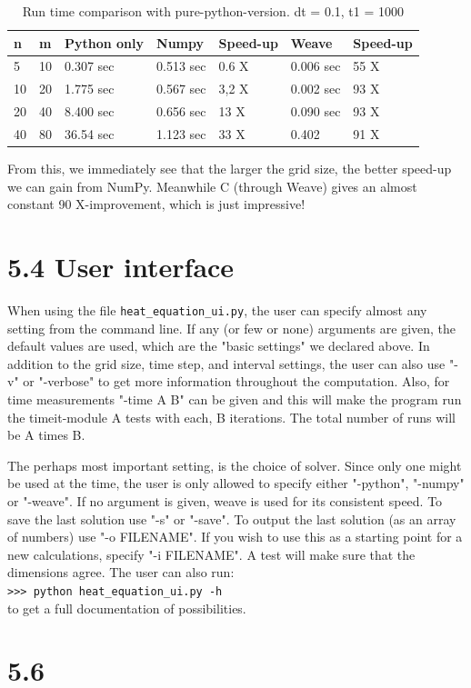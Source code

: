 \documentclass[a4paper]{article}
\begin{document}
\begin{table}[ht]
\centering
\begin{tabular}{|l|l|l|l|l|l|l|}
\hline
\textbf{n} & \textbf{m} & \textbf{Python only} & \textbf{Numpy} & \textbf{Speed-up} & \textbf{Weave} & \textbf{Speed-up} \\ \hline
5 & 10 & 0.307 sec & 0.513 sec & 0.6 X & 0.006 sec & 55 X \\ \hline
10 & 20 & 1.775 sec & 0.567 sec & 3,2 X & 0.002 sec & 93 X \\ \hline
20 & 40 & 8.400 sec & 0.656 sec & 13 X & 0.090 sec & 93 X \\ \hline
40 & 80 & 36.54 sec & 1.123 sec & 33 X & 0.402 & 91 X \\ \hline
\end{tabular}
\caption{Run time comparison with pure-python-version. dt = 0.1, t1 = 1000\label{FIG:test2}}
\end{table}

From this, we immediately see that the larger the grid size, the better speed-up we can gain from NumPy. Meanwhile C (through Weave) gives an almost constant 90 X-improvement, which is just impressive!

\section*{5.4 User interface}
When using the file \texttt{heat\_equation\_ui.py}, the user can specify almost any setting from the command line. If any (or few or none) arguments are given, the default values are used, which are the "basic settings" we declared above. 
In addition to the grid size, time step, and interval settings, the user can also use "-v" or "-verbose" to get more information throughout the computation. Also, for time measurements "-time A B" can be given and this will make the program run the timeit-module A tests with each, B iterations. The total number of runs will be A times B.
\newline

The perhaps most important setting, is the choice of solver. Since only one might be used at the time, the user is only allowed to specify either "-python", "-numpy" or "-weave". If no argument is given, weave is used for its consistent speed. To save the last solution use "-s" or "-save". To output the last solution (as an array of numbers) use "-o FILENAME". If you wish to use this as a starting point for a new calculations, specify "-i FILENAME". A test will make sure that the dimensions agree. The user can also run:\\
\texttt{>>> python heat\_equation\_ui.py -h}\\
to get a full documentation of possibilities.

\section*{5.6}
\end{document}
